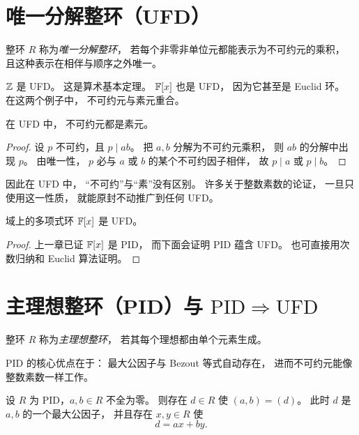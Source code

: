 \section{唯一分解整环（UFD）}

\begin{definition}
整环 $R$ 称为\emph{唯一分解整环}，
若每个非零非单位元都能表示为不可约元的乘积，
且这种表示在相伴与顺序之外唯一。
\end{definition}

\begin{example}
$\mathbb{Z}$ 是 UFD。
这是算术基本定理。
$\mathbb{F}[x]$ 也是 UFD，
因为它甚至是 Euclid 环。
在这两个例子中，
不可约元与素元重合。
\end{example}

\begin{proposition}
在 UFD 中，
不可约元都是素元。
\end{proposition}

\begin{proof}
设 $p$ 不可约，且 $p\mid ab$。
把 $a,b$ 分解为不可约元乘积，
则 $ab$ 的分解中出现 $p$。
由唯一性，
$p$ 必与 $a$ 或 $b$ 的某个不可约因子相伴，
故 $p\mid a$ 或 $p\mid b$。
\end{proof}

\begin{remark}
因此在 UFD 中，
“不可约”与“素”没有区别。
许多关于整数素数的论证，
一旦只使用这一性质，
就能原封不动推广到任何 UFD。
\end{remark}

\begin{proposition}
域上的多项式环 $\mathbb{F}[x]$ 是 UFD。
\end{proposition}

\begin{proof}
上一章已证 $\mathbb{F}[x]$ 是 PID，
而下面会证明 PID 蕴含 UFD。
也可直接用次数归纳和 Euclid 算法证明。
\end{proof}

\section{主理想整环（PID）与 $\mathrm{PID}\Rightarrow\mathrm{UFD}$}

\begin{definition}
整环 $R$ 称为\emph{主理想整环}，
若其每个理想都由单个元素生成。
\end{definition}

PID 的核心优点在于：
最大公因子与 Bezout 等式自动存在，
进而不可约元能像整数素数一样工作。

\begin{lemma}
设 $R$ 为 PID，$a,b\in R$ 不全为零。
则存在 $d\in R$ 使 $(a,b)=(d)$。
此时 $d$ 是 $a,b$ 的一个最大公因子，
并且存在 $x,y\in R$ 使
\[
d=ax+by.
\]
\end{lemma}

